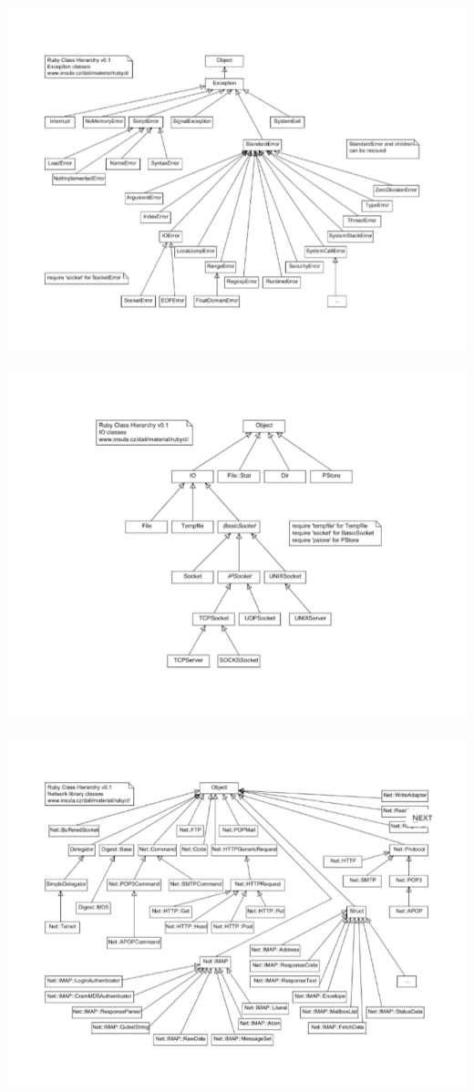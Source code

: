 \documentclass[a4paper,12pt,openany]{book}
\begin{document}
\includegraphics[width=1\linewidth,center]{img/ruby-class-hierachie-exeption.png}\\
\\
\includegraphics[width=1\linewidth,center]{img/ruby-class-hierachie-io.png}\\
\\
\includegraphics[width=1\linewidth,center]{img/ruby-class-hierachie-networkLib.png}\\
\\
\end{document}
